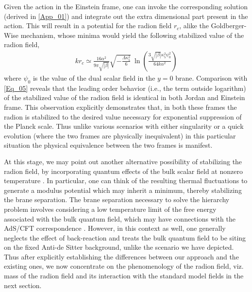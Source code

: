 \documentclass{article}
\begin{document}
Given the action in the Einstein frame, one can invoke the corresponding solution (derived in \ref{App_01}) and integrate out the extra dimensional part present in the action. This will result in a potential for the radion field $r_{c}$, alike the Goldberger-Wise mechanism, whose minima would yield the following stabilized value of the radion field,
\begin{align}
kr_{c}\simeq \frac{16\alpha ^{2}}{9 \pi \sqrt{|\beta|}}\sqrt{-\frac{\Lambda \kappa _{5}^{2}}{6}}~\ln \left(\frac{3\sqrt{|\beta|}\kappa _{5}^{2}\psi _{0}^{2}}{64k\alpha ^{2}} \right)
\end{align}
where $\psi _{0}$ is the value of the dual scalar field in the $y=0$ brane. Comparison with \ref{Eq_05} reveals that the leading order behavior (i.e., the term outside logarithm) of the stabilized value of the radion field is identical in both Jordan and Einstein frame. This observation explicitly demonstrates that, in both these frames the radion is stabilized to the desired value necessary for exponential suppression of the Planck scale. Thus unlike various scenarios with either singularity or a quick evolution  (where the two frames are physically inequivalent) in this particular situation the physical equivalence between the two frames is manifest. 

At this stage, we may point out another alternative possibility of stabilizing the radion field, by incorporating quantum effects of the bulk scalar field at nonzero temperature \cite{Brevik:2000vt,Brevik:2001bi}. In particular, one can think of the resulting thermal fluctuations to generate a modulus potential which may inherit a minimum, thereby stabilizing the brane separation. The brane separation necessary to solve the hierarchy problem involves considering a low temperature limit of the free energy associated with the bulk quantum field, which may have connections with the AdS/CFT correspondence \cite{Brevik:2000vt,Brevik:2001bi}. However, in this context as well, one generally neglects the effect of back-reaction and treats the bulk quantum field to be siting on the fixed Anti-de Sitter background, unlike the scenario we have depicted. Thus after explicitly establishing the differences between our approach and the existing ones, we now concentrate on the phenomenology of the radion field, viz. mass of the radion field and its interaction with the standard model fields in the next section.
\end{document}
